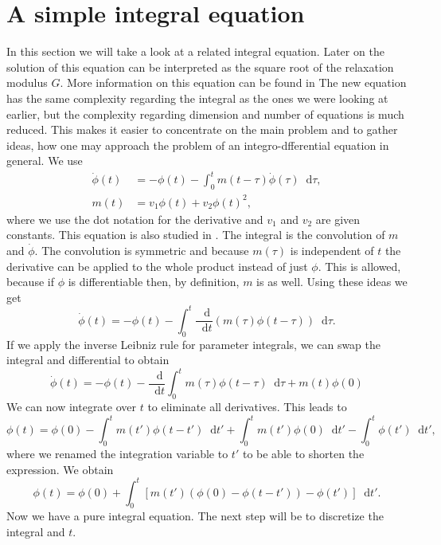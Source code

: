 \documentclass[12pt,a4paper,twoside, open=right]{scrreprt}
\theoremstyle{definition}
\theoremstyle{plain}
\newcommand{\D}{\mathop{}\!\mathrm{d}}
\begin{document}
\section{A simple integral equation}
In this section we will take a look at a related integral equation. Later on the solution of this equation can be interpreted as the square root of the relaxation modulus $G$. More information on this equation can be found in \cite{Gnann2012} The new equation has the same complexity regarding the integral as the ones we were looking at earlier, but the complexity regarding dimension and number of equations is much reduced. This makes it easier to concentrate on the main problem and to gather ideas, how one may approach the problem of an integro-dfferential equation in general. We use 
\begin{align}
   \dot\phi(t)&=-\phi(t)-\int_0^tm(t-\tau)\dot\phi(\tau)\D\tau,\\
   m(t)&=v_1\phi(t)+v_2\phi(t)^2,
\end{align}
where we use the dot notation for the derivative and $v_1$ and $v_2$ are given constants. This equation is also studied in \cite{Goetze1995}.
The integral is the convolution of $m$ and $\dot\phi$. The convolution is symmetric and because $m(\tau)$ is independent of $t$ the derivative can be applied to the whole product instead of just $\phi$. This is allowed, because if $\phi$ is differentiable then, by definition, $m$ is as well. Using these ideas we get
\begin{equation}
    \dot\phi(t)=-\phi(t)-\int_0^t\frac{\D}{\D t}(m(\tau)\phi(t-\tau))\D\tau.
\end{equation}
If we apply the inverse Leibniz rule for parameter integrals, we can swap the integral and differential to obtain
\begin{equation}
    \dot\phi(t)=-\phi(t) -\frac{\D}{\D t}\int_0^t m(\tau)\phi(t-\tau)\D\tau +m(t)\phi(0)
\end{equation}
We can now integrate over $t$ to eliminate all derivatives. This leads to 
\begin{equation}
    \phi(t)=\phi(0)-\int_0^tm(t')\phi(t-t')\D t' +\int_0^tm(t')\phi(0)\D t' -\int_0^t\phi(t')\D t',
\end{equation}
where we renamed the integration variable to $t'$ to be able to shorten the expression. We obtain
\begin{equation}
    \phi(t)=\phi(0)+\int_0^t[m(t')(\phi(0)-\phi(t-t'))-\phi(t')]\D t'.\label{eq:phianalytic}
\end{equation}
Now we have a pure integral equation. The next step will be to discretize the integral and $t$.
\end{document}
